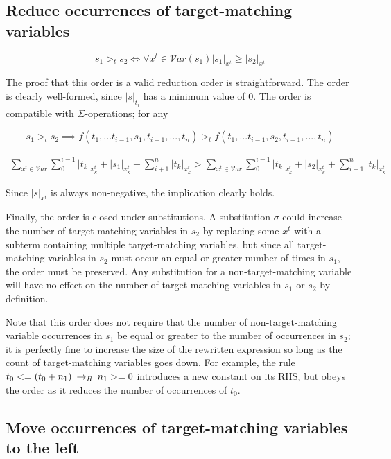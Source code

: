 \subsection{Reduce occurrences of target-matching variables}

\[ s_1 >_t s_2 \iff \forall x^t \in \mathcal{V}ar(s_1) |s_1|_{x^t} \geq |s_2|_{x^t}
\]

The proof that this order is a valid reduction order is straightforward. The order is clearly well-formed, since $|s|_{t_i}$ has a minimum value of 0. The order is compatible with $\Sigma$-operations; for any

\[ s_1 >_t s_2 \implies f(t_1,...t_{i-1},s_1,t_{i+1},...,t_n) >_t f(t_1,...t_{i-1},s_2,t_{i+1},...,t_n)
\]

\begin{align*}
\sum_{x^t \in \mathcal{V}ar} \sum_{0}^{i - 1} |t_k|_{x^t_k} + |s_1|_{x^t_k} + \sum_{i + 1}^{n} |t_k|_{x^t_k} >
\sum_{x^t \in \mathcal{V}ar} \sum_{0}^{i - 1} |t_k|_{x^t_k} + |s_2|_{x^t_k} + \sum_{i + 1}^{n} |t_k|_{x^t_k}
\end{align*}

Since $|s|_{x^t}$ is always non-negative, the implication clearly holds.

Finally, the order is closed under substitutions. A substitution $\sigma$ could increase the number of target-matching variables in $s_2$ by replacing some $x^t$ with a subterm containing multiple target-matching variables, but since all target-matching variables in $s_2$ must occur an equal or greater number of times in $s_1$, the order must be preserved. Any substitution for a non-target-matching variable will have no effect on the number of target-matching variables in $s_1$ or $s_2$ by definition. 

Note that this order does not require that the number of non-target-matching variable occurrences in $s_1$ be equal or greater to the number of occurrences in $s_2$; it is perfectly fine to increase the size of the rewritten expression so long as the count of target-matching variables goes down. For example, the rule $t_0 <= (t_0 + n_1) \:\rightarrow_{R}\: n_1 >= 0$ introduces a new constant on its RHS, but obeys the order as it reduces the number of occurrences of $t_0$.

\subsection{Move occurrences of target-matching variables to the left}

